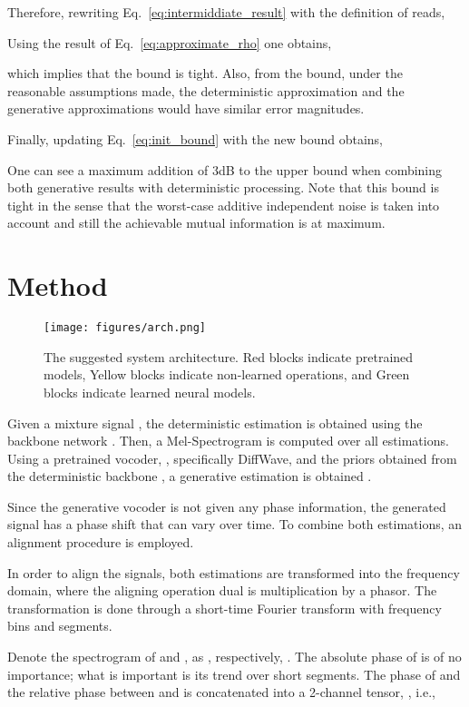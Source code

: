 \documentclass{article}
\theoremstyle{plain}
\theoremstyle{definition}
\theoremstyle{remark}
\begin{document}
Therefore, rewriting Eq.~\ref{eq:intermiddiate_result} with the definition of  reads,


Using the result of Eq.~\ref{eq:approximate_rho} one obtains,

which implies that the bound is tight. 
Also, from the bound, under the reasonable assumptions made, the deterministic approximation and the generative approximations would have similar error magnitudes.

Finally, updating Eq.~\ref{eq:init_bound} with the new bound obtains,



One can see a maximum addition of 3dB to the upper bound when combining both generative results with deterministic processing. Note that this bound is tight in the sense that the worst-case additive independent noise is taken into account and still the achievable mutual information is at maximum. 

\section{Method}
\begin{figure*}
    \centering
\texttt{[image: figures/arch.png]}
    \caption{The suggested system architecture. Red blocks indicate pretrained models, Yellow blocks indicate non-learned operations, and Green blocks indicate learned neural models.}
    \label{fig:arc}
\end{figure*}
Given a mixture signal , the deterministic estimation  is obtained using the backbone network .
Then, a Mel-Spectrogram is computed over all  estimations. \\


Using a pretrained vocoder, , specifically DiffWave, and the priors obtained from the deterministic backbone , a generative estimation is obtained .


Since the generative vocoder is not given any phase information, the generated signal has a phase shift that can vary over time. To combine both estimations, an alignment procedure is employed.

In order to align the signals, both estimations are transformed into the frequency domain, where the aligning operation dual is multiplication by a phasor. The transformation is done through a short-time Fourier transform with  frequency bins and  segments.

Denote the spectrogram of  and , as ,  respectively, . The absolute phase of  is of no importance; what is important is its trend over short segments.
The phase of  and the relative phase between  and  is concatenated into a 2-channel tensor, , i.e.,
\end{document}
